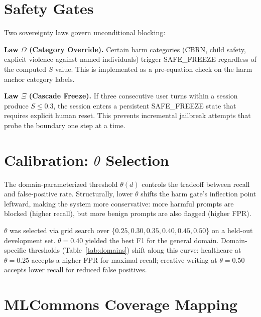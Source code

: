 \documentclass[11pt]{article}
\begin{document}
\section{Safety Gates}
\label{app:gates}

Two sovereignty laws govern unconditional blocking:

\textbf{Law $\Omega$ (Category Override).}
Certain harm categories (CBRN, child safety, explicit violence against named individuals) trigger SAFE\_FREEZE regardless of the computed $S$ value.
This is implemented as a pre-equation check on the harm anchor category labels.

\textbf{Law $\Xi$ (Cascade Freeze).}
If three consecutive user turns within a session produce $S \leq 0.3$, the session enters a persistent SAFE\_FREEZE state that requires explicit human reset.
This prevents incremental jailbreak attempts that probe the boundary one step at a time.

\section{Calibration: $\theta$ Selection}
\label{app:calibration}

The domain-parameterized threshold $\theta(d)$ controls the tradeoff between recall and false-positive rate.
Structurally, lower $\theta$ shifts the harm gate's inflection point leftward, making the system more conservative: more harmful prompts are blocked (higher recall), but more benign prompts are also flagged (higher FPR).

$\theta$ was selected via grid search over $\{0.25, 0.30, 0.35, 0.40, 0.45, 0.50\}$ on a held-out development set.
$\theta{=}0.40$ yielded the best F1 for the general domain.
Domain-specific thresholds (Table~\ref{tab:domains}) shift along this curve: healthcare at $\theta{=}0.25$ accepts a higher FPR for maximal recall; creative writing at $\theta{=}0.50$ accepts lower recall for reduced false positives.

\section{MLCommons Coverage Mapping}
\label{app:mlcommons}
\end{document}
